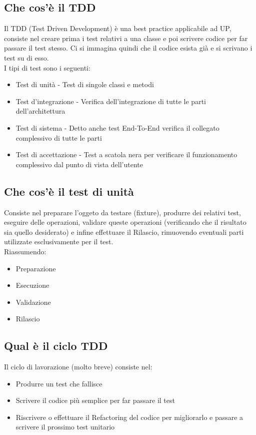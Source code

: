 \documentclass[12pt, a4paper, openany]{book}
\begin{document}
\subsection*{Che cos'è il TDD}
Il TDD (Test Driven Development) è una best practice applicabile ad UP, 
consiste nel creare prima i test relativi a una classe e poi scrivere codice per far
passare il test stesso.
Ci si immagina quindi che il codice esista già e si scrivano i test su di esso.\\
I tipi di test sono i seguenti:
\begin{itemize}
    \item Test di unità - Test di singole classi e metodi
    \item Test d'integrazione - Verifica dell'integrazione di tutte le parti dell'architettura
    \item Test di sistema - Detto anche test End-To-End verifica il collegato complessivo di tutte
    le parti
    \item Test di accettazione - Test a scatola nera per verificare il funzionamento
    complessivo dal punto di vista dell'utente
\end{itemize}

\subsection*{Che cos'è il test di unità}
Consiste nel preparare l'oggeto da testare (fixture), produrre dei relativi test,
eseguire delle operazioni, validare queste operazioni (verificando che il risultato sia quello desiderato)
e infine effettuare il Rilascio, rimuovendo eventuali parti utilizzate esclusivamente per il test.\\
Riassumendo:
\begin{itemize}
    \item Preparazione
    \item Esecuzione
    \item Validazione
    \item Rilascio
\end{itemize}

\subsection*{Qual è il ciclo TDD}
Il ciclo di lavorazione (molto breve) consiste nel:
\begin{itemize}
    \item Produrre un test che fallisce
    \item Scrivere il codice più semplice per far passare il test
    \item Riscrivere o effettuare il Refactoring del codice per migliorarlo e passare a scrivere il prossimo
    test unitario
\end{itemize}
\end{document}

